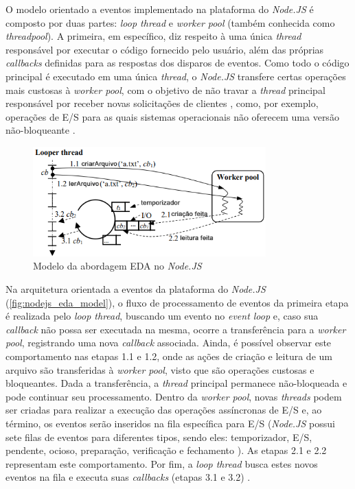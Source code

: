 \documentclass[12pt]{article}
\begin{document}
O modelo orientado a eventos implementado na plataforma do \textit{Node.JS} é composto por duas partes: 
\textit{loop thread} e \textit{worker pool} (também conhecida como \textit{threadpool}). A primeira, em específico, 
diz respeito à uma única \textit{thread} responsável por executar o código fornecido pelo usuário, além 
das próprias \textit{callbacks} definidas para as respostas dos disparos de eventos. Como todo o código principal 
é executado em uma única \textit{thread}, o \textit{Node.JS} transfere certas operações mais custosas à \textit{worker pool}, 
com o objetivo de não travar a \textit{thread} principal responsável por receber novas solicitações de 
clientes \cite{BUGS} \cite{ATOMICITY}, 
como, por exemplo, operações de E/S para as quais sistemas operacionais não oferecem uma versão não-bloqueante 
\cite{NODEBLOCKEVENTLOOP}. 

\begin{figure}[H]
\centering
\includegraphics[width=0.8\textwidth]{images/pt-br/eda-arch-nodejs.png}
\caption{Modelo da abordagem EDA no \textit{Node.JS}}\label{fig:nodejs_eda_model}
\end{figure}

Na arquitetura orientada a eventos da plataforma do \textit{Node.JS} (\autoref{fig:nodejs_eda_model}), 
o fluxo de processamento de eventos da primeira etapa é realizada pelo \textit{loop thread}, 
buscando um evento no \textit{event loop} e, caso sua \textit{callback} não possa ser executada na mesma, ocorre
a transferência para a \textit{worker pool}, registrando uma nova \textit{callback} associada. 
Ainda, é possível observar este comportamento nas etapas 1.1 e 1.2, onde as ações de criação e leitura de 
um arquivo são transferidas à \textit{worker pool}, visto que são operações custosas e bloqueantes. Dada 
a transferência, a \textit{thread} principal permanece não-bloqueada e pode continuar seu processamento. 
Dentro da \textit{worker pool}, novas \textit{threads} podem ser criadas para realizar a execução das operações
assíncronas de E/S e, ao término, os eventos serão inseridos na fila específica para E/S (\textit{Node.JS} 
possui sete filas de eventos para diferentes tipos, sendo eles: temporizador, E/S, pendente, ocioso, preparação, 
verificação e fechamento \cite{NODEEVENTLOOP}). As etapas 2.1 e 2.2 representam este comportamento.
Por fim, a \textit{loop thread} busca estes novos eventos na fila e executa suas 
\textit{callbacks} (etapas 3.1 e 3.2) \cite{BUGS}.
\end{document}
